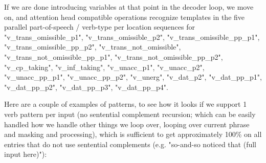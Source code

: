 \documentclass[11pt]{article}
\begin{document}
If we are done introducing variables at that point in the decoder loop, we move on, 
and attention head compatible operations recognize templates in the five parallel part-of-speech / verb-type per location sequences for "v\_trans\_omissible\_p1", "v\_trans\_omissible\_p2", "v\_trans\_omissible\_pp\_p1", "v\_trans\_omissible\_pp\_p2", "v\_trans\_not\_omissible", "v\_trans\_not\_omissible\_pp\_p1", "v\_trans\_not\_omissible\_pp\_p2", "v\_cp\_taking", "v\_inf\_taking", "v\_unacc\_p1", "v\_unacc\_p2", "v\_unacc\_pp\_p1", "v\_unacc\_pp\_p2", "v\_unerg", "v\_dat\_p2", "v\_dat\_pp\_p1", "v\_dat\_pp\_p2",  "v\_dat\_pp\_p3",  "v\_dat\_pp\_p4".

Here are a couple of examples of patterns, to see how it looks if we support 1 verb pattern per input (no sentential complement recursion; which can be easily handled how we handle other things we loop over, looping over current phrase and masking and processing), which is sufficient to get approximately 100\% on all entries that do not use sentential complements (e.g. "so-and-so noticed that (full input here)"):
\end{document}
